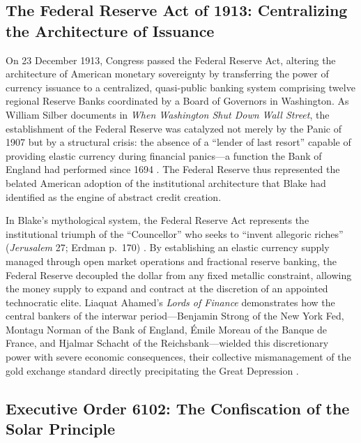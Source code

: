 \documentclass[
]{article}
\begin{document}
\subsection{The Federal Reserve Act of 1913: Centralizing the
Architecture of
Issuance}\label{the-federal-reserve-act-of-1913-centralizing-the-architecture-of-issuance}

On 23 December 1913, Congress passed the Federal Reserve Act, altering
the architecture of American monetary sovereignty by transferring the
power of currency issuance to a centralized, quasi-public banking system
comprising twelve regional Reserve Banks coordinated by a Board of
Governors in Washington. As William Silber documents in \emph{When
Washington Shut Down Wall Street}, the establishment of the Federal
Reserve was catalyzed not merely by the Panic of 1907 but by a
structural crisis: the absence of a ``lender of last resort'' capable of
providing elastic currency during financial panics---a function the Bank
of England had performed since 1694 \citep{silber2007when}. The Federal
Reserve thus represented the belated American adoption of the
institutional architecture that Blake had identified as the engine of
abstract credit creation.

In Blake's mythological system, the Federal Reserve Act represents the
institutional triumph of the ``Councellor'' who seeks to ``invent
allegoric riches'' (\emph{Jerusalem} 27; Erdman p.~170)
\citep{erdman1988complete}. By establishing an elastic currency supply
managed through open market operations and fractional reserve banking,
the Federal Reserve decoupled the dollar from any fixed metallic
constraint, allowing the money supply to expand and contract at the
discretion of an appointed technocratic elite. Liaquat Ahamed's
\emph{Lords of Finance} demonstrates how the central bankers of the
interwar period---Benjamin Strong of the New York Fed, Montagu Norman of
the Bank of England, Émile Moreau of the Banque de France, and Hjalmar
Schacht of the Reichsbank---wielded this discretionary power with severe
economic consequences, their collective mismanagement of the gold
exchange standard directly precipitating the Great Depression
\citep{ahamed2009lords}.

\subsection{Executive Order 6102: The Confiscation of the Solar
Principle}\label{executive-order-6102-the-confiscation-of-the-solar-principle}
\end{document}
